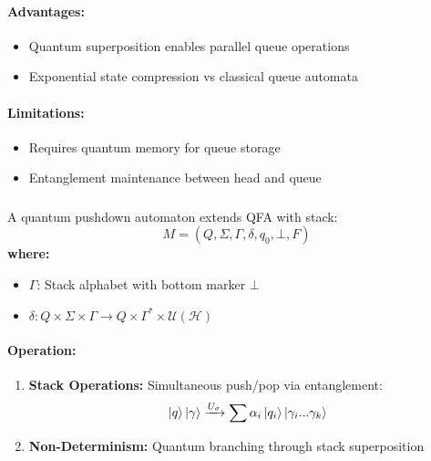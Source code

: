 \paragraph{Advantages:}
\begin{itemize}
    \item Quantum superposition enables parallel queue operations
    \item Exponential state compression vs classical queue automata
\end{itemize}

\paragraph{Limitations:}
\begin{itemize}
    \item Requires quantum memory for queue storage
    \item Entanglement maintenance between head and queue
\end{itemize}

\subsubsection{}
\label{subsec:qpa}

\begin{definition}
A quantum pushdown automaton extends QFA with stack:
\[
M = (Q, \Sigma, \Gamma, \delta, q_0, \bot, F)
\]
\textbf{where:}
\begin{itemize}
    \item $\Gamma$: Stack alphabet with bottom marker $\bot$
    \item $\delta: Q \times \Sigma \times \Gamma \rightarrow Q \times \Gamma^* \times \mathcal{U}(\mathcal{H})$
\end{itemize}
\end{definition}

\paragraph{Operation:}
\begin{enumerate}
    \item \textbf{Stack Operations:} Simultaneous push/pop via entanglement:
    \[
    \ket{q}\ket{\gamma} \xrightarrow{U_\sigma} \sum \alpha_i \ket{q_i}\ket{\gamma_i...\gamma_k}
    \]
    \item \textbf{Non-Determinism:} Quantum branching through stack superposition
\end{enumerate}

